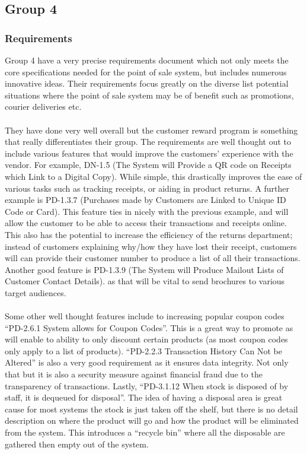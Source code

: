 \documentclass[a4paper]{article}
\begin{document}
\subsection{Group 4}
\subsubsection{Requirements}
Group 4 have a very precise requirements document which not only meets the core specifications needed for the point of sale system, but includes numerous innovative ideas. Their requirements focus greatly on the diverse list potential situations where the point of sale system may be of benefit such as promotions, courier deliveries etc.
\\\\
They have done very well overall but the customer reward program is something that really differentiates their group. The requirements are well thought out to include various features that would improve the customers’ experience with the vendor. For example, DN-1.5 (The System will Provide a QR code on Receipts which Link to a Digital Copy). While simple, this drastically improves the ease of various tasks such as tracking receipts, or aiding in product returns. A further example is PD-1.3.7 (Purchases made by Customers are Linked to Unique ID Code or Card). This feature ties in nicely with the previous example, and will allow the customer to be able to access their transactions and receipts online. This also has the potential to increase the efficiency of the returns department; instead of customers explaining why/how they have lost their receipt, customers will can provide their customer number to produce a list of all their transactions. Another good feature is PD-1.3.9 (The System will Produce Mailout Lists of Customer Contact Details).  as that will be vital to send brochures to various target audiences.
\\\\
Some other well thought features include to increasing popular coupon codes “PD-2.6.1 System allows for Coupon Codes”. This is a great way to promote as will enable to ability to only discount certain products (as most coupon codes only apply to a list of products). “PD-2.2.3 Transaction History Can Not be Altered” is also a very good requirement as it ensures data integrity. Not only that but it is also a security measure against financial fraud due to the transparency of transactions. Lastly, “PD-3.1.12 When stock is disposed of by staff, it is dequeued for disposal”. The idea of having a disposal area is great cause for most systems the stock is just taken off the shelf, but there is no detail description on where the product will go and how the product will be eliminated from the system. This introduces a “recycle bin” where all the disposable are gathered then empty out of the system. 
\end{document}
